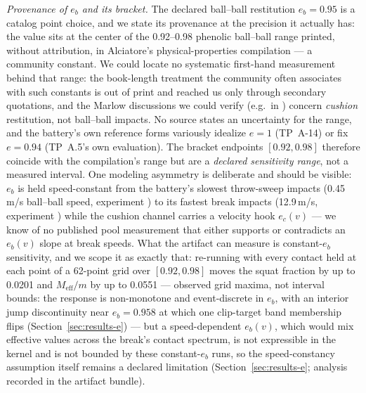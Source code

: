 \emph{Provenance of $e_b$ and its bracket.} The declared ball--ball
restitution $e_b = 0.95$ is a catalog point choice, and we state its
provenance at the precision it actually has: the value sits at the
center of the 0.92--0.98 phenolic ball--ball range printed, without
attribution, in Alciatore's physical-properties compilation
\citep{alciatore_faq} --- a community constant. We could locate no
systematic first-hand measurement behind that range: the book-length
treatment the community often associates with such constants
\citep{marlow1995physics} is out of print and reached us only through
secondary quotations, and the Marlow discussions we could verify (e.g.\
in \citealp{mathavan2010cushion}) concern \emph{cushion} restitution,
not ball--ball impacts. No source states an uncertainty for the range,
and the battery's own reference
forms variously idealize $e = 1$ (TP~A-14) or fix $e = 0.94$ (TP~A.5's
own evaluation). The bracket endpoints $[0.92, 0.98]$ therefore coincide
with the compilation's range but are a \emph{declared
sensitivity range}, not a measured interval. One modeling asymmetry is
deliberate and should be visible: $e_b$ is held speed-constant from the
battery's slowest throw-sweep impacts (0.45\,m/s ball--ball speed,
experiment \expid{A3}) to its fastest break impacts (12.9\,m/s,
experiment ) while the cushion channel carries a velocity
hook $e_c(v)$ --- we know of no published pool measurement that either
supports or contradicts an $e_b(v)$ slope at break speeds. What the
artifact can measure is constant-$e_b$ sensitivity, and we scope it as
exactly that: re-running \expid{E3} with every contact held at each
point of a 62-point grid over $[0.92, 0.98]$ moves the squat fraction
by up to 0.0201 and $M_{\mathrm{eff}}/m$ by up to 0.0551 --- observed
grid maxima, not interval bounds: the response is non-monotone and
event-discrete in $e_b$, with an interior jump discontinuity near
$e_b = 0.958$ at which one clip-target band membership flips
(Section~\ref{sec:results-e}) --- but a speed-dependent $e_b(v)$, which would mix
effective values across the break's contact spectrum, is not
expressible in the kernel and is not bounded by these constant-$e_b$
runs, so the speed-constancy assumption itself remains a declared
limitation (Section~\ref{sec:results-e}; analysis recorded in the
artifact bundle).

